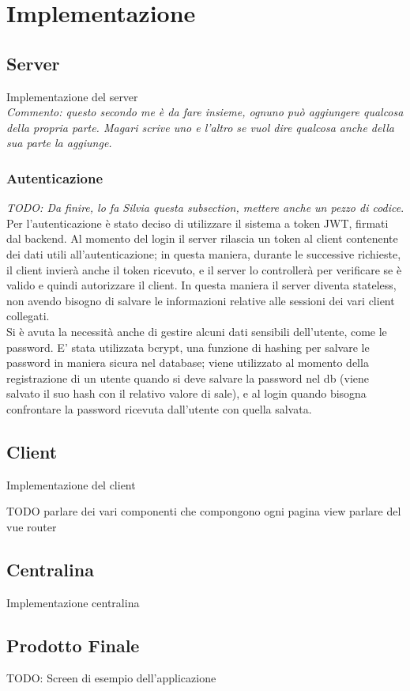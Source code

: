 

\chapter{Implementazione}
\section{Server}
Implementazione del server\\
\textit{Commento: questo secondo me è da fare insieme, ognuno può aggiungere qualcosa della propria parte. Magari scrive uno e l'altro se vuol dire qualcosa anche della sua parte la aggiunge.}

\subsection{Autenticazione}
\textit{TODO: Da finire, lo fa Silvia questa subsection, mettere anche un pezzo di codice}.\\ 
Per l'autenticazione è stato deciso di utilizzare il sistema a token JWT, firmati dal backend. Al momento
del login il server rilascia un token al client contenente dei dati
utili all’autenticazione; in questa maniera, durante le successive richieste,
il client invierà anche il token ricevuto, e il server lo controllerà per verificare
se è valido e quindi autorizzare il client. In questa maniera il server
diventa stateless, non avendo bisogno di salvare le informazioni relative
alle sessioni dei vari client collegati.\\

Si è avuta la necessità anche di gestire alcuni dati sensibili dell'utente, come le password. E' stata utilizzata bcrypt, una funzione di hashing per salvare le password in maniera sicura
nel database; viene utilizzato al momento della registrazione di un utente
quando si deve salvare la password nel db (viene salvato il suo hash con il
relativo valore di sale), e al login quando bisogna confrontare la password
ricevuta dall’utente con quella salvata. 



\section{Client}
Implementazione del client

TODO parlare dei vari componenti che compongono ogni pagina view
parlare del vue router

\section{Centralina}
Implementazione centralina


\section{Prodotto Finale}
TODO: Screen di esempio dell'applicazione